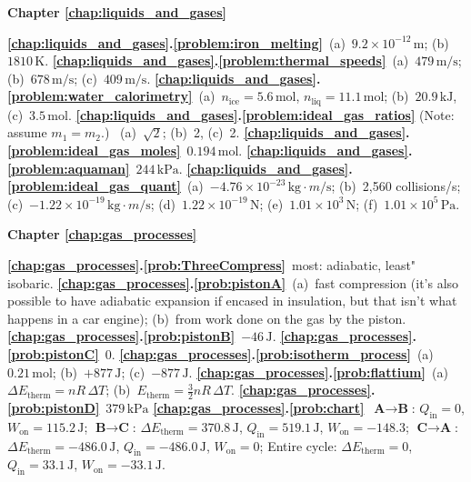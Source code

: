  \textbf{Chapter \ref{chap:liquids_and_gases}}


\textbf{\ref{chap:liquids_and_gases}.\ref{problem:iron_melting}}~(a)~$9.2\times 10^{-12}\,\text{m}$; (b)~$1810
\,\text{K}$.
\textbf{\ref{chap:liquids_and_gases}.\ref{problem:thermal_speeds}}~(a)~$479
\,\text{m/s}$; (b)~$678\,\text{m/s}$; (c)~$409\,\text{m/s}$.
\textbf{\ref{chap:liquids_and_gases}.\ref{problem:water_calorimetry}}~(a)~$n_\text{ice}=5.6\,\text{mol}$, $n_\text{liq}=11.1\,\text{mol}$; 
(b)~$20.9\,\text{kJ}$, (c)~$3.5\,\text{mol}$.
\textbf{\ref{chap:liquids_and_gases}.\ref{problem:ideal_gas_ratios}} 
(Note:  assume $m_1 = m_2$.) ~(a)~$\sqrt{2}$; (b)~2, (c)~2.
\textbf{\ref{chap:liquids_and_gases}.\ref{problem:ideal_gas_moles}}~$0.194\,\text{mol}$.
\textbf{\ref{chap:liquids_and_gases}.\ref{problem:aquaman}}~$244\,\text{kPa}$.
\textbf{\ref{chap:liquids_and_gases}.\ref{problem:ideal_gas_quant}}~(a)~$-4.76
\times 10^{-23}\,\text{kg}\cdot \text{}m/\text{s}$; (b)~2,560 collisions/s; (c)~$-1.22\times
10^{-19}\,\text{kg}\cdot \text{}m/\text{s}$; (d)~$1.22\times 10^{-19}\,\text{N}$;
(e)~$1.01\times 10^3\,\text{N}$; (f)~$1.01\times 10^5\,\text{Pa}$.


 \textbf{Chapter \ref{chap:gas_processes}}


\textbf{\ref{chap:gas_processes}.\ref{prob:ThreeCompress}}~most: adiabatic,
least" isobaric.
\textbf{\ref{chap:gas_processes}.\ref{prob:pistonA}}~(a)~fast compression 
(it's also possible to have adiabatic expansion if encased in insulation, 
but that isn't what happens in a car engine); (b)~from work done on the 
gas by the piston. 
\textbf{\ref{chap:gas_processes}.\ref{prob:pistonB}}~$-46\,\text{J}$.
\textbf{\ref{chap:gas_processes}.\ref{prob:pistonC}}~$0$.
\textbf{\ref{chap:gas_processes}.\ref{prob:isotherm_process}}~(a)~$0.21\,\text{mol}$; (b)~$+877\,\text{J}$; (c)~$-877\,\text{J}$.
\textbf{\ref{chap:gas_processes}.\ref{prob:flattium}}~(a)~$\Delta 
E_\text{therm} = nR\, \Delta T$; (b)~$E_\text{therm} = \frac{3}{2}nR\, \Delta T$.
\textbf{\ref{chap:gas_processes}.\ref{prob:pistonD}}~$379\,\text{kPa}$
\textbf{\ref{chap:gas_processes}.\ref{prob:chart}}~$\textbf{A}\rightarrow
\textbf{B}$: $Q_\text{in} = 0$, $W_\text{on} = 115.2\,\text{J}$; 
$\textbf{B}\rightarrow \textbf{C}$: 
$\Delta E_\text{therm} = 370.8\,\text{J}$, $Q_\text{in} = 519.1\,\text{J}$, 
$W_\text{on} = -148.3$; 
$\textbf{C}\rightarrow \textbf{A}$: 
$\Delta E_\text{therm} = -486.0\,\text{J}$, $Q_\text{in} = -486.0\,\text{J}$, 
$W_\text{on} = 0$; 
Entire cycle: $\Delta E_\text{therm} = 0$, $Q_\text{in} = 33.1\,\text{J}$, 
$W_\text{on} = -33.1\,\text{J}$.




